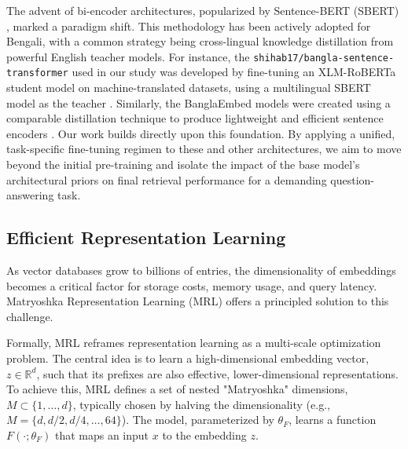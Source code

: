 \documentclass[acmsmall,screen,review]{acmart}
\begin{document}
The advent of bi-encoder architectures, popularized by Sentence-BERT (SBERT) \cite{reimers2019sentence}, marked a paradigm shift. This methodology has been actively adopted for Bengali, with a common strategy being cross-lingual knowledge distillation from powerful English teacher models. For instance, the \texttt{shihab17/bangla-sentence-transformer} used in our study was developed by fine-tuning an XLM-RoBERTa student model on machine-translated datasets, using a multilingual SBERT model as the teacher \cite{uddin2024bangla}. Similarly, the BanglaEmbed models were created using a comparable distillation technique to produce lightweight and efficient sentence encoders \cite{kabir2024banglaembed}. Our work builds directly upon this foundation. By applying a unified, task-specific fine-tuning regimen to these and other architectures, we aim to move beyond the initial pre-training and isolate the impact of the base model's architectural priors on final retrieval performance for a demanding question-answering task.

\subsection{Efficient Representation Learning}
As vector databases grow to billions of entries, the dimensionality of embeddings becomes a critical factor for storage costs, memory usage, and query latency. Matryoshka Representation Learning (MRL) \cite{kusupati2022matryoshka} offers a principled solution to this challenge.

Formally, MRL reframes representation learning as a multi-scale optimization problem. The central idea is to learn a high-dimensional embedding vector, $z \in \mathbb{R}^d$, such that its prefixes are also effective, lower-dimensional representations. To achieve this, MRL defines a set of nested "Matryoshka" dimensions, $M \subset \{1, \dots, d\}$, typically chosen by halving the dimensionality (e.g., $M = \{d, d/2, d/4, \dots, 64\}$). The model, parameterized by $\theta_F$, learns a function $F(\cdot; \theta_F)$ that maps an input $x$ to the embedding $z$.
\end{document}
